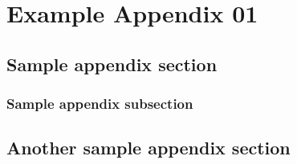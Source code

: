 \chapter{Example Appendix 01}
\label{chpt:appendix_01}

\blindtext

\section{Sample appendix section}

\blindtext

\subsection{Sample appendix subsection}

\blindtext

\section{Another sample appendix section}

\blindtext